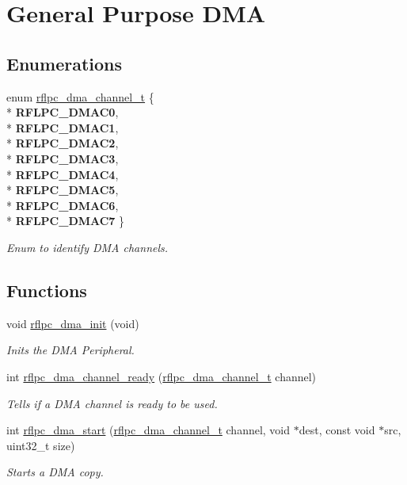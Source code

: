 \hypertarget{group__dma}{\section{General Purpose D\-M\-A}
\label{group__dma}
}
\subsection*{Enumerations}
\begin{DoxyCompactItemize}
\item 
enum \hyperlink{group__dma_ga95122ad7327f7b184fdc914d30bf2f2d}{rflpc\-\_\-dma\-\_\-channel\-\_\-t} \{ \\*
{\bfseries R\-F\-L\-P\-C\-\_\-\-D\-M\-A\-C0}, 
\\*
{\bfseries R\-F\-L\-P\-C\-\_\-\-D\-M\-A\-C1}, 
\\*
{\bfseries R\-F\-L\-P\-C\-\_\-\-D\-M\-A\-C2}, 
\\*
{\bfseries R\-F\-L\-P\-C\-\_\-\-D\-M\-A\-C3}, 
\\*
{\bfseries R\-F\-L\-P\-C\-\_\-\-D\-M\-A\-C4}, 
\\*
{\bfseries R\-F\-L\-P\-C\-\_\-\-D\-M\-A\-C5}, 
\\*
{\bfseries R\-F\-L\-P\-C\-\_\-\-D\-M\-A\-C6}, 
\\*
{\bfseries R\-F\-L\-P\-C\-\_\-\-D\-M\-A\-C7}
 \}
\begin{DoxyCompactList}\small\item\em Enum to identify D\-M\-A channels. \end{DoxyCompactList}\end{DoxyCompactItemize}
\subsection*{Functions}
\begin{DoxyCompactItemize}
\item 
void \hyperlink{group__dma_ga8751adacb3ac3764c426f2e142951916}{rflpc\-\_\-dma\-\_\-init} (void)
\begin{DoxyCompactList}\small\item\em Inits the D\-M\-A Peripheral. \end{DoxyCompactList}\item 
int \hyperlink{group__dma_ga36b6658b4994b20d9d08bbe9425950c3}{rflpc\-\_\-dma\-\_\-channel\-\_\-ready} (\hyperlink{group__dma_ga95122ad7327f7b184fdc914d30bf2f2d}{rflpc\-\_\-dma\-\_\-channel\-\_\-t} channel)
\begin{DoxyCompactList}\small\item\em Tells if a D\-M\-A channel is ready to be used. \end{DoxyCompactList}\item 
int \hyperlink{group__dma_gad72ed242e36f2827ea3a6f22b92a05f9}{rflpc\-\_\-dma\-\_\-start} (\hyperlink{group__dma_ga95122ad7327f7b184fdc914d30bf2f2d}{rflpc\-\_\-dma\-\_\-channel\-\_\-t} channel, void $\ast$dest, const void $\ast$src, uint32\-\_\-t size)
\begin{DoxyCompactList}\small\item\em Starts a D\-M\-A copy. \end{DoxyCompactList}\end{DoxyCompactItemize}


